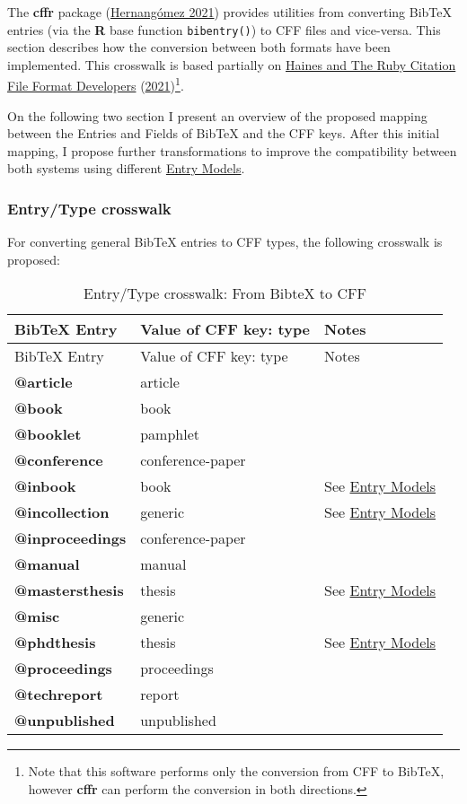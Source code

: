 \documentclass[
]{article}
\begin{document}
The \textbf{cffr} package
(\protect\hyperlink{ref-hernangomez2021}{Hernangómez 2021}) provides
utilities from converting BibTeX entries (via the \textbf{R} base
function \texttt{bibentry()}) to CFF files and vice-versa. This section
describes how the conversion between both formats have been implemented.
This crosswalk is based partially on
\protect\hyperlink{ref-Haines_Ruby_CFF_Library_2021}{Haines and The Ruby
Citation File Format Developers}
(\protect\hyperlink{ref-Haines_Ruby_CFF_Library_2021}{2021})\footnote{Note
  that this software performs only the conversion from CFF to BibTeX,
  however \textbf{cffr} can perform the conversion in both directions.}.

On the following two section I present an overview of the proposed
mapping between the Entries and Fields of BibTeX and the CFF keys. After
this initial mapping, I propose further transformations to improve the
compatibility between both systems using different
\protect\hyperlink{entry-models}{Entry Models}.

\hypertarget{entrytype-crosswalk}{%
\subsubsection{Entry/Type crosswalk}\label{entrytype-crosswalk}}

For converting general BibTeX entries to CFF types, the following
crosswalk is proposed:

\begin{longtable}[]{@{}lll@{}}
\caption{Entry/Type crosswalk: From BibteX to CFF}\tabularnewline
\toprule
BibTeX Entry & Value of CFF key: type & Notes \\
\midrule
\endfirsthead
\toprule
BibTeX Entry & Value of CFF key: type & Notes \\
\midrule
\endhead
\textbf{@article} & article & \\
\textbf{@book} & book & \\
\textbf{@booklet} & pamphlet & \\
\textbf{@conference} & conference-paper & \\
\textbf{@inbook} & book & See \protect\hyperlink{entry-models}{Entry
Models} \\
\textbf{@incollection} & generic & See
\protect\hyperlink{entry-models}{Entry Models} \\
\textbf{@inproceedings} & conference-paper & \\
\textbf{@manual} & manual & \\
\textbf{@mastersthesis} & thesis & See
\protect\hyperlink{entry-models}{Entry Models} \\
\textbf{@misc} & generic & \\
\textbf{@phdthesis} & thesis & See
\protect\hyperlink{entry-models}{Entry Models} \\
\textbf{@proceedings} & proceedings & \\
\textbf{@techreport} & report & \\
\textbf{@unpublished} & unpublished & \\
\bottomrule
\end{longtable}
\end{document}
